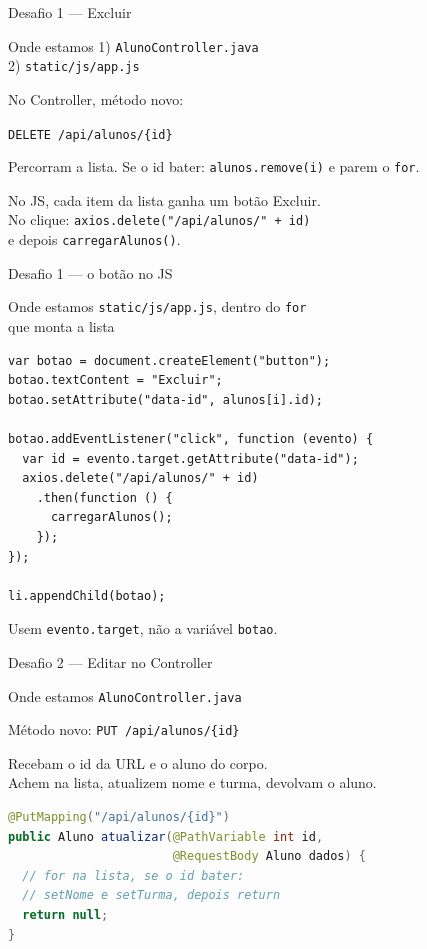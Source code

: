 \documentclass[aspectratio=169,11pt]{beamer}
\newcommand{\onde}[1]{%
  \begin{block}{Onde estamos}
    #1
  \end{block}
}
\begin{document}
\begin{frame}{Desafio 1 --- Excluir}
  \onde{1) \texttt{AlunoController.java}\\
        2) \texttt{static/js/app.js}}

  No Controller, método novo:

  \vspace{0.3em}
  \texttt{DELETE /api/alunos/\{id\}}

  \vspace{0.4em}
  Percorram a lista. Se o id bater:
  \texttt{alunos.remove(i)} e parem o \texttt{for}.

  \vspace{0.4em}
  No JS, cada item da lista ganha um botão Excluir.\\
  No clique: \texttt{axios.delete("/api/alunos/" + id)}\\
  e depois \texttt{carregarAlunos()}.
\end{frame}

\begin{frame}[fragile]{Desafio 1 --- o botão no JS}
  \onde{\texttt{static/js/app.js}, dentro do \texttt{for}\\
        que monta a lista}

\begin{lstlisting}[basicstyle=\ttfamily\footnotesize]
var botao = document.createElement("button");
botao.textContent = "Excluir";
botao.setAttribute("data-id", alunos[i].id);

botao.addEventListener("click", function (evento) {
  var id = evento.target.getAttribute("data-id");
  axios.delete("/api/alunos/" + id)
    .then(function () {
      carregarAlunos();
    });
});

li.appendChild(botao);
\end{lstlisting}

  Usem \texttt{evento.target}, não a variável \texttt{botao}.
\end{frame}

\begin{frame}[fragile]{Desafio 2 --- Editar no Controller}
  \onde{\texttt{AlunoController.java}}

  Método novo: \texttt{PUT /api/alunos/\{id\}}

  \vspace{0.3em}
  Recebam o id da URL e o aluno do corpo.\\
  Achem na lista, atualizem nome e turma, devolvam o aluno.

\begin{lstlisting}[language=Java,basicstyle=\ttfamily\footnotesize]
@PutMapping("/api/alunos/{id}")
public Aluno atualizar(@PathVariable int id,
                       @RequestBody Aluno dados) {
  // for na lista, se o id bater:
  // setNome e setTurma, depois return
  return null;
}
\end{lstlisting}
\end{frame}
\end{document}
